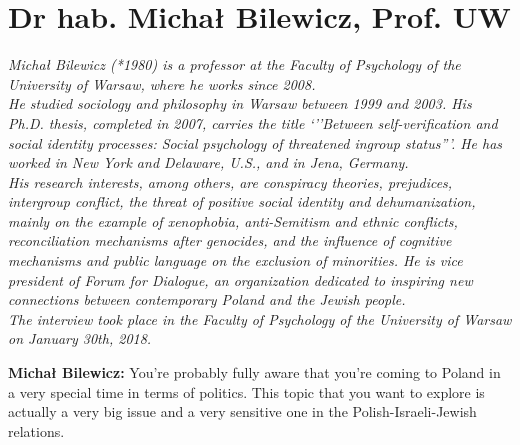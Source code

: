 \section{Dr hab. Michał Bilewicz, Prof. UW}

\textit{Michał Bilewicz (*1980) is a professor at the Faculty of Psychology of the University of Warsaw, where he works since 2008. \\
He studied sociology and philosophy in Warsaw between 1999 and 2003. His Ph.D. thesis, completed in 2007, carries the title `''Between self-verification and social identity processes: Social psychology of threatened ingroup status'''. 
He has worked in New York and Delaware, U.S., and in Jena, Germany. \\
His research interests, among others, are conspiracy theories, prejudices, intergroup conflict, the threat of positive social identity and dehumanization, mainly on the example of xenophobia, anti-Semitism and ethnic conflicts, reconciliation mechanisms after genocides, and the influence of cognitive mechanisms and public language on the exclusion of minorities.
He is vice president of Forum for Dialogue, an organization dedicated to inspiring new connections between contemporary Poland and the Jewish people. \\
The interview took place in the Faculty of Psychology of the University of Warsaw on January 30th, 2018.}\par
\vspace*{2em}
\textbf{Michał Bilewicz:} You're probably fully aware that you're coming to Poland in a very special time in terms of politics. This topic that you want to explore is actually a very big issue and a very sensitive one in the Polish-Israeli-Jewish relations.\\
